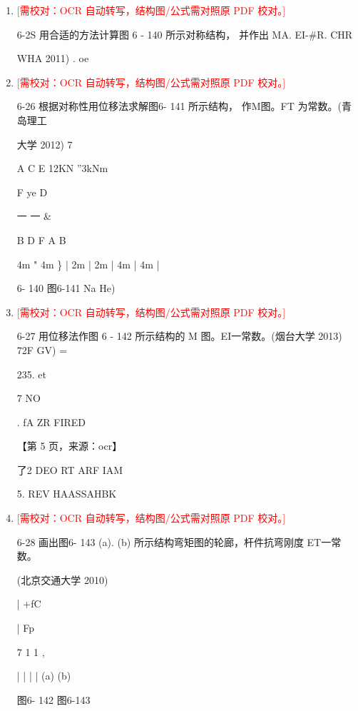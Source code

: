 \documentclass[UTF8,12pt,a4paper,openany]{ctexbook}
\newcommand{\TODO}[1]{\textcolor{red}{[需校对：#1]}}
\begin{document}
\begin{enumerate}[label=\textbf{\arabic*.},leftmargin=2em]
\item \TODO{OCR 自动转写，结构图/公式需对照原 PDF 校对。}\par 6-2S   用合适的方法计算图 6 - 140 所示对称结构，  并作出 MA. EI-\#R. CHR\par WHA 2011)                     .                              oe
\item \TODO{OCR 自动转写，结构图/公式需对照原 PDF 校对。}\par 6-26 根据对称性用位移法求解图6- 141 所示结构，  作M图。FT 为常数。(青岛理工\par 大学 2012)                                 7\par A         C         E                        12KN ”3kNm\par F       ye                               D\par 一                            一                                               \&\par B         D         F                         A         B\par 4m   "  4m   \}             | 2m | 2m |   4m   |   4m   |\par 6- 140                                     图6-141                 Na He)
\item \TODO{OCR 自动转写，结构图/公式需对照原 PDF 校对。}\par 6-27 用位移法作图 6 - 142 所示结构的 M 图。EI一常数。(烟台大学 2013) 72F GV) =\par 235. et\par 7 NO\par .                                                      fA ZR FIRED\par \par 【第 5 页，来源：ocr】\par 了2 DEO RT ARF IAM\par 5. REV HAASSAHBK
\item \TODO{OCR 自动转写，结构图/公式需对照原 PDF 校对。}\par 6-28 画出图6- 143 (a). (b) 所示结构弯矩图的轮廊，杆件抗弯刚度 ET一常数。\par (北京交通大学 2010)\par |    +fC\par | Fp\par 7          1           1                                             ,\par |          |          |           |                      (a)                       (b)\par 图6- 142                                                            图6-143

\end{enumerate}
\end{document}
